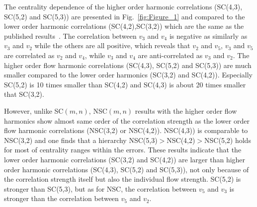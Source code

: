 \documentclass[ALICE,manyauthors]{cernphprep}
\begin{document}
The centrality dependence of the higher order harmonic correlations (SC(4,3), SC(5,2) and SC(5,3)) are presented in Fig.~\ref{fig:Figure_1} and compared to the lower order harmonic correlations (SC(4,2),SC(3,2)) which are the same as the published results~\cite{ALICE:2016kpq}. The correlation between $v_3$ and $v_4$ is negative as similarly as $v_3$ and $v_2$ while the others are all positive, which reveals that $v_2$ and $v_5$, $v_3$ and $v_5$ are correlated as $v_2$ and $v_4$, while $v_3$ and $v_4$ are anti-correlated as $v_3$ and $v_2$.
The higher order flow harmonic correlations (SC(4,3), SC(5,2) and SC(5,3)) are much smaller compared to the lower order harmonics (SC(3,2) and SC(4,2)). Especially SC(5,2) is 10 times smaller than SC(4,2) and SC(4,3) is about 20 times smaller that SC(3,2).


However, unlike SC$(m,n)$, NSC$(m,n)$ results with the higher order flow harmonics show almost same order of the correlation strength as the lower order flow harmonic correlations (NSC(3,2) or NSC(4,2)). NSC(4,3)) is comparable to NSC(3,2) and one finds that a hierarchy NSC(5,3)$>$NSC(4,2)$>$NSC(5,2) holds for most of centrality ranges within the errors.
These results indicate that the lower order harmonic correlations (SC(3,2) and SC(4,2)) are larger than higher order harmonic correlations (SC(4,3), SC(5,2) and SC(5,3)), not only because of the correlation strength itself but also the individual flow strength. 
SC(5,2) is stronger than SC(5,3), but as for NSC, the correlation between $v_5$ and $v_3$ is stronger than the correlation between $v_5$ and $v_2$. 
\end{document}
